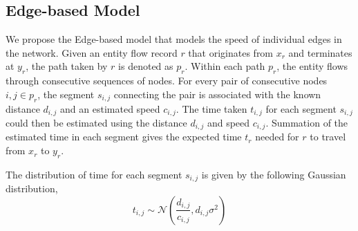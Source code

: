 \documentclass[conference]{IEEEtran.1.8}
\begin{document}
\subsection{Edge-based Model}

We propose the Edge-based model that models the speed of individual edges in the network. Given an entity flow record $r$ that originates from $x_r$ and terminates at $y_r$, the path taken by $r$ is denoted as $p_r$. Within each path $p_r$, the entity flows through consecutive sequences of nodes. For every pair of consecutive nodes $i,j \in p_r$, the segment $s_{i,j}$ connecting the pair is associated with the known distance $d_{i,j}$ and an estimated speed $c_{i,j}$. The time taken $t_{i,j}$ for each segment $s_{i,j}$ could then be estimated using the distance $d_{i,j}$ and speed $c_{i,j}$. Summation of the estimated time in each segment gives the expected time $t_r$ needed for $r$ to travel from $x_r$ to $y_r$.

The distribution of time for each segment $s_{i,j}$ is given by the following Gaussian distribution,
\[ t_{i,j} \sim \mathcal{N} \left( \frac{d_{i,j}}{c_{i,j}}, d_{i,j} \sigma^2 \right) \]
\end{document}
